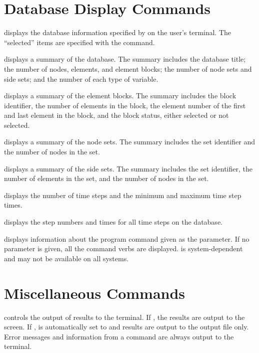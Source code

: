 \section{Database Display Commands}
\label{cmd:display}

 {
 displays the database information specified by 
on the user's terminal. The ``selected'' items are specified with the
 command.

 {
displays a summary of the database. The summary includes the database
title; the number of nodes, elements, and element blocks; the number of
node sets and side sets; and the number of each type of
variable.
}

 {
displays a summary of the element blocks. The summary includes
the block identifier, the number of elements in the block, the element
number of the first and last element in the block, and the block status,
either selected or not selected.
}

 {
displays a summary of the node sets. The summary
includes the set identifier and the number of nodes in the set.
}

 {
displays a summary of the side sets. The summary
includes the set identifier, the number of elements in the set, and the
number of nodes in the set.
}

 {
displays the number of time steps and the minimum and maximum time step
times.
}

 {
displays the step numbers and times for all time steps on the database.
}
}

\filbreak
{} {
 displays information about the program command given as the
parameter. If no parameter is given, all the command verbs are
displayed.  is system-dependent and may not be available on
all systems.
}
\filbreak
\section{Miscellaneous Commands}\label{sec:misc}

 {
 controls the output of results to the terminal.  If ,
the results are output to the screen. If ,  is
automatically set to  and results are output to the output file
only.  Error messages and information from a  command are
always output to the terminal. 
}

